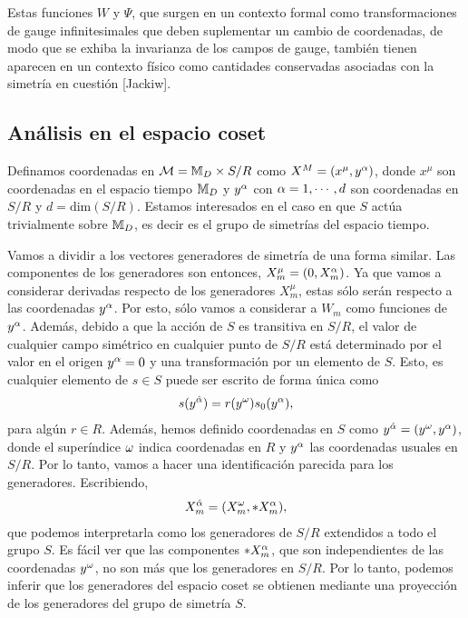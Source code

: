 Estas funciones $W$ y $\Psi$, que surgen en un contexto formal como transformaciones de gauge infinitesimales que deben suplementar un cambio de coordenadas, de modo que se exhiba la invarianza de los campos de gauge, también tienen aparecen en un contexto físico como cantidades conservadas asociadas con la simetría en cuestión [Jackiw].

\subsection{Análisis en el espacio coset}\label{sec:4.3.3}

Definamos coordenadas en $\mathcal{M}=\mathbb{M}_D\times S/R$ como $X^M=(x^\mu,y^\alpha)$, donde $x^\mu$ son coordenadas en el espacio tiempo $\mathbb{M}_D$ y $y^\alpha$ con $\alpha=1,\cdots,d$ son coordenadas en $S/R$ y $d=\text{dim}(S/R)$. Estamos interesados en el caso en que $S$ actúa trivialmente sobre $\mathbb{M}_D$, es decir es el grupo de simetrías del espacio tiempo.

Vamos a dividir a los vectores generadores de simetría de una forma similar. Las componentes de los generadores son entonces, $X^\mu_m=(0,X^\alpha_m)$. Ya que vamos a considerar derivadas respecto de los generadores $X^\mu_m$, estas sólo serán respecto a las coordenadas $y^\alpha$. Por esto, sólo vamos a considerar a $W_m$ como funciones de $y^\alpha$. Además, debido a que la acción de $S$ es transitiva en $S/R$, el valor de cualquier campo simétrico en cualquier punto de $S/R$ está determinado por el valor en el origen $y^\alpha=0$ y una transformación por un elemento de $S$. Esto, es cualquier elemento de $s\in S$ puede ser escrito de forma única como
\begin{align}
	s(y^{\hat{\alpha}}) = r(y^\omega)s_0(y^\alpha), \label{eq:4.3.3.1}
\end{align}
para algún $r\in R$. Además, hemos definido coordenadas en $S$ como $y^{\hat{\alpha}}=(y^\omega,y^\alpha)$, donde el superíndice $\omega$ indica coordenadas en $R$ y $y^\alpha$ las coordenadas usuales en $S/R$. Por lo tanto, vamos a hacer una identificación parecida para los generadores. Escribiendo,
\begin{align}
	X^{\hat{\alpha}}_m=(X^\omega_m,*X^\alpha_m),
\end{align}
que podemos interpretarla como los generadores de $S/R$ extendidos a todo el grupo $S$. Es fácil ver que las componentes $*X^\alpha_m$, que son independientes de las coordenadas $y^\omega$, no son más que los generadores en $S/R$. Por lo tanto, podemos inferir que los generadores del espacio coset se obtienen mediante una proyección de los generadores del grupo de simetría $S$.

